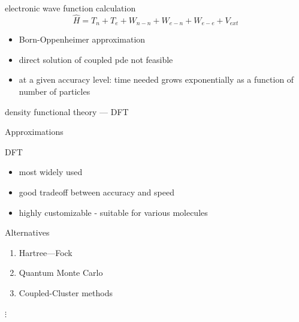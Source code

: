 \documentclass[slovene, usenames,dvipsnames]{beamer}
\begin{document}
  
  \begin{frame}{electronic wave function calculation}
    \begin{equation}\nonumber
      \hat H = T_n + T_e + W_{n-n} +  W_{e-n} + W_{e-e} +V_{ext}
    \end{equation}

    
    
    \begin{itemize}[]
    \item Born-Oppenheimer approximation
    \item direct solution of coupled pde not feasible
    \item at a given accuracy level: time needed grows exponentially as a function
      of number of particles
    \end{itemize}
    
  \end{frame}

  
  \begin{frame}{density functional theory --- DFT}

    \centering Approximations
    \\
    \begin{minipage}[t]{0.5\textwidth}

      \centering  DFT
      \begin{itemize}
      \item most widely used
      \item good tradeoff between accuracy and speed
       \item highly customizable - suitable for various molecules
      \end{itemize}
      
    \end{minipage}%
    \begin{minipage}[t]{0.5\textwidth}
       \centering  Alternatives
      \centering
      \begin{enumerate}[$\ast$]
      \item Hartree---Fock
      \item Quantum Monte Carlo
      \item Coupled-Cluster methods
      \end{enumerate}
      \centering  $\vdots$
    \end{minipage}
    
  \end{frame}
  
\end{document}
